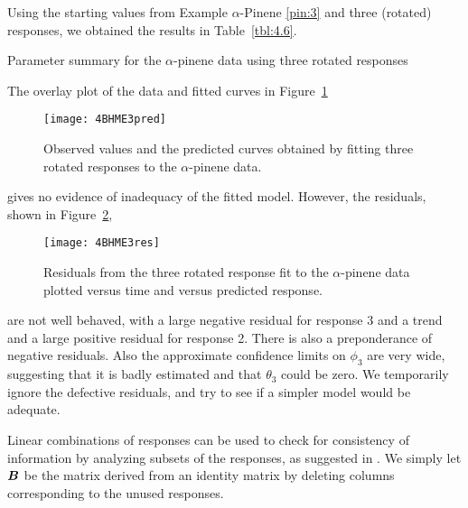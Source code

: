 \begin{example}\label{pin:5a}
Using the starting values from Example $\alpha$-Pinene \ref{pin:3} and
three (rotated) responses, we obtained the results in
Table~\ref{tbl:4.6}.
\begin{table}
  \caption{\label{tbl:4.6}
  Parameter summary for the $\alpha$-pinene data using three rotated
  responses}
\end{table}
The overlay plot of the data and fitted curves in
Figure~\ref{fig:BHME3pred}
  \begin{figure}
    \centerline{\texttt{[image: 4BHME3pred]}}%
    \caption{\label{fig:BHME3pred}
    Observed values and the predicted curves obtained by fitting three
    rotated responses to the $\alpha$-pinene data.
    }
  \end{figure}
gives no evidence of inadequacy of the fitted model.
However, the residuals, shown in Figure~\ref{fig:BHME3res},
  \begin{figure}
    \centerline{\texttt{[image: 4BHME3res]}}%
    \caption{\label{fig:BHME3res}
    Residuals from the three rotated response fit to the $\alpha$-pinene
    data plotted versus time and versus predicted response.
    }
  \end{figure}
are not well behaved, with a large negative residual for response 3 and
a trend and a large positive residual for response 2.
There is also a preponderance of negative residuals.
Also the approximate confidence limits on $\phi_{3}$ are
very wide, suggesting that it is badly estimated and that $\theta_{3}$
could be zero.
We temporarily ignore the defective residuals, and try to see if a
simpler model would be adequate.
\end{example}

Linear combinations of responses can be used to check for consistency of
information by analyzing subsets of the responses, as suggested in
.
We simply let ${\boldsymbol B}$ be the matrix derived from an identity
matrix by deleting columns corresponding to the unused responses.

